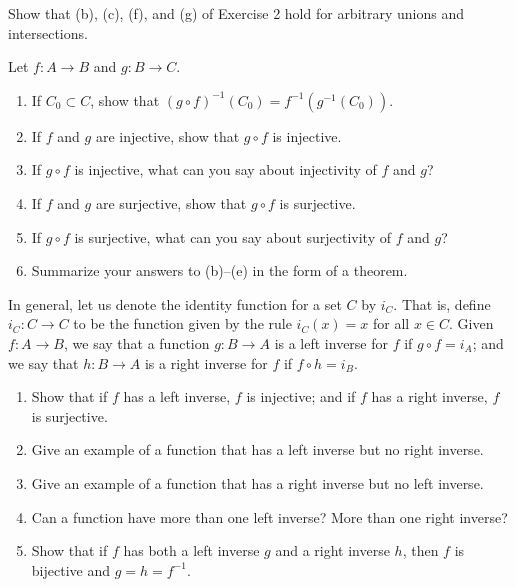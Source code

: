   \begin{exercise}[Munkres 2.3]
    Show that (b), (c), (f), and (g) of Exercise 2 hold for arbitrary unions and intersections.
  \end{exercise}
  \begin{solution}
    
  \end{solution}

  \begin{exercise}[Munkres 2.4]
    Let $f: A \to B$ and $g: B \to C$.
    \begin{enumerate}
      \item If $C_0 \subset C$, show that $(g \circ f)^{-1}(C_0) = f^{-1}(g^{-1}(C_0))$.
      \item If $f$ and $g$ are injective, show that $g \circ f$ is injective.
      \item If $g \circ f$ is injective, what can you say about injectivity of $f$ and $g$?
      \item If $f$ and $g$ are surjective, show that $g \circ f$ is surjective.
      \item If $g \circ f$ is surjective, what can you say about surjectivity of $f$ and $g$?
      \item Summarize your answers to (b)--(e) in the form of a theorem.
    \end{enumerate}
  \end{exercise}
  \begin{solution}
    
  \end{solution}

  \begin{exercise}[Munkres 2.5]
    In general, let us denote the identity function for a set $C$ by $i_C$. That is, define $i_C: C \to C$ to be the function given by the rule $i_C(x) = x$ for all $x \in C$. Given $f: A \to B$, we say that a function $g: B \to A$ is a left inverse for $f$ if $g \circ f = i_A$; and we say that $h: B \to A$ is a right inverse for $f$ if $f \circ h = i_B$.
    \begin{enumerate}
      \item Show that if $f$ has a left inverse, $f$ is injective; and if $f$ has a right inverse, $f$ is surjective.
      \item Give an example of a function that has a left inverse but no right inverse.
      \item Give an example of a function that has a right inverse but no left inverse.
      \item Can a function have more than one left inverse? More than one right inverse?
      \item Show that if $f$ has both a left inverse $g$ and a right inverse $h$, then $f$ is bijective and $g = h = f^{-1}$.
    \end{enumerate}
  \end{exercise}
  \begin{solution}
    
  \end{solution}

